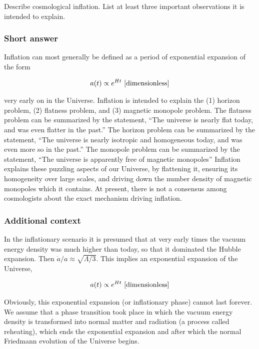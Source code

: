 \documentclass[a4paper,11pt]{article}
\begin{document}
Describe cosmological inflation. List at least three important observations it is intended to explain.

\subsubsection{Short answer}

Inflation can most generally be defined as a period of exponential expansion of the form

\begin{align*}
    a(t) \propto e^{Ht} ~ [{\rm dimensionless}]
\end{align*}

{\noindent}very early on in the Universe. Inflation is intended to explain the (1) horizon problem, (2) flatness problem, and (3) magnetic monopole problem. The flatness problem can be summarized by the statement, ``The universe is nearly flat today, and was even flatter in the past.'' The horizon problem can be summarized by the statement, ``The universe is nearly isotropic and homogeneous today, and was even more so in the past.'' The monopole problem can be summarized by the statement, ``The universe is apparently free of magnetic monopoles'' Inflation explains these puzzling aspects of our Universe, by flattening it, ensuring its homogeneity over large scales, and driving down the number density of magnetic monopoles which it contains. At present, there is not a consensus among cosmologists about the exact mechanism driving inflation.

\subsubsection{Additional context}

In the inflationary scenario it is presumed that at very
early times the vacuum energy density was much higher
than today, so that it dominated the Hubble expansion. Then $\dot{a}/a\approx\sqrt{\Lambda/3}$. This implies an exponential expansion of the Universe,

\begin{align*}
    a(t) \propto e^{Ht} ~ [{\rm dimensionless}]
\end{align*}

{\noindent}Obviously, this exponential expansion (or inflationary phase) cannot last forever. We assume that a phase transition took place in which the vacuum energy density is transformed into normal matter and radiation (a process called reheating), which ends the exponential expansion and after which the normal Friedmann evolution of the Universe begins.
\end{document}
